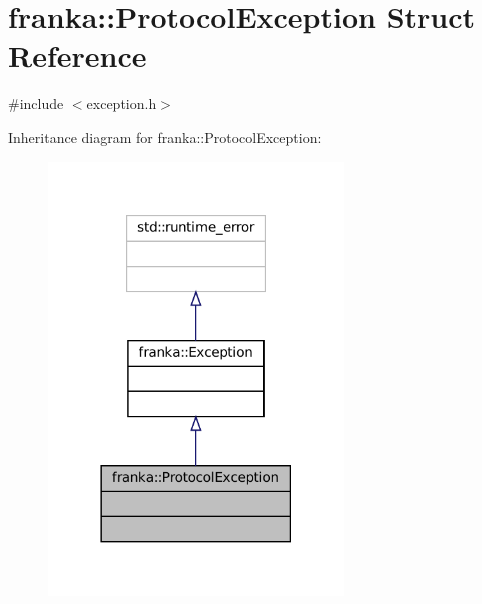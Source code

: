 \hypertarget{structfranka_1_1ProtocolException}{}\section{franka\+:\+:Protocol\+Exception Struct Reference}
\label{structfranka_1_1ProtocolException}


{\ttfamily \#include $<$exception.\+h$>$}



Inheritance diagram for franka\+:\+:Protocol\+Exception\+:
\nopagebreak
\begin{figure}[H]
\begin{center}
\leavevmode
\includegraphics[width=222pt]{structfranka_1_1ProtocolException__inherit__graph}
\end{center}
\end{figure}


